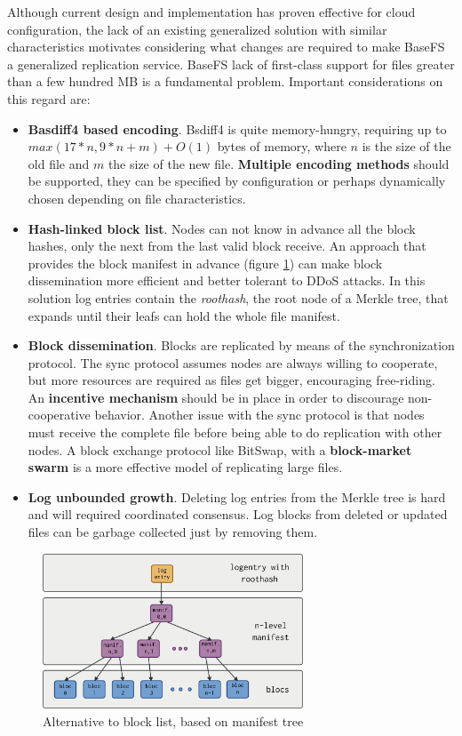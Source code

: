 \documentclass{sig-alternate}
\begin{document}
Although current design and implementation has proven effective for cloud configuration, the lack of an existing generalized solution with similar characteristics motivates considering what changes are required to make BaseFS a generalized replication service. BaseFS lack of first-class support for files greater than a few hundred MB is a fundamental problem. Important considerations on this regard are:  
\begin{itemize}
 \item \textbf{Basdiff4 based encoding}. Bsdiff4 is quite memory-hungry, requiring up to $max(17*n,9*n+m)+O(1)$ bytes of memory, where $n$ is the size of the old file and $m$ the size of the new file. \textbf{Multiple encoding methods} should be supported, they can be specified by configuration or perhaps dynamically chosen depending on file characteristics.
 \item \textbf{Hash-linked block list}. Nodes can not know in advance all the block hashes, only the next from the last valid block receive. An approach that provides the block manifest in advance (figure \ref{fig:infohash}) can make block dissemination more efficient and better tolerant to DDoS attacks. In this solution log entries contain the \textit{roothash}, the root node of a Merkle tree, that expands until their leafs can hold the whole file manifest.
  \item \textbf{Block dissemination}. Blocks are replicated by means of the synchronization protocol. The sync protocol assumes nodes are always willing to cooperate, but more resources are required as files get bigger, encouraging free-riding. An \textbf{incentive mechanism} should be in place in order to discourage non-cooperative behavior. Another issue with the sync protocol is that nodes must receive the complete file before being able to do replication with other nodes. A block exchange protocol like BitSwap, with a \textbf{block-market swarm} is a more effective model of replicating large files.
  \item \textbf{Log unbounded growth}. Deleting log entries from the Merkle tree is hard and will required coordinated consensus\cite{letia2009crdts}. Log blocks from deleted or updated files can be garbage collected just by removing them.
\end{itemize}

\begin{figure}
\centering
\includegraphics[width=220pt]{imgs/infohash.png}
\caption{Alternative to block list, based on manifest tree}
\label{fig:infohash}
\end{figure}
\end{document}
